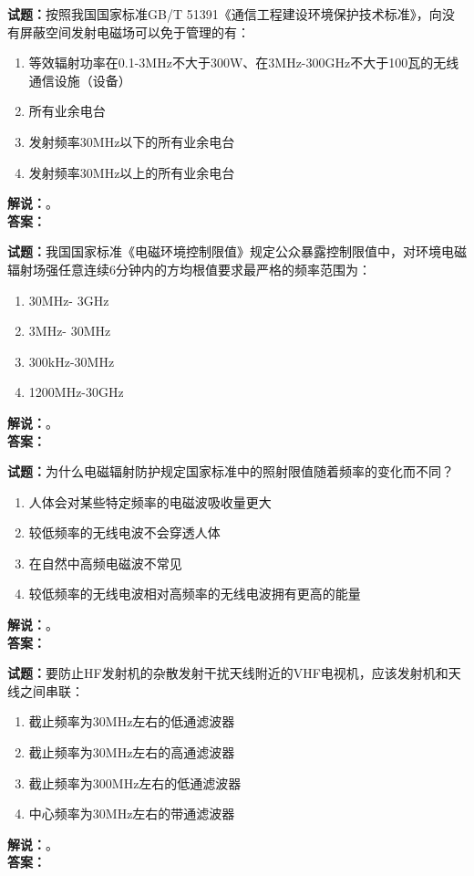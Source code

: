\documentclass{ctexbook}
\begin{document}
\noindent\textbf{试题：}按照我国国家标准GB/T 51391《通信工程建设环境保护技术标准》，向没有屏蔽空间发射电磁场可以免于管理的有：
\begin{enumerate}[leftmargin=3em]
\item 等效辐射功率在0.1-3\unit{\MHz}不大于300W、在3\unit{\MHz}-300\unit{\GHz}不大于100瓦的无线通信设施（设备）
\item 所有业余电台
\item 发射频率30\unit{\MHz}以下的所有业余电台
\item 发射频率30\unit{\MHz}以上的所有业余电台
\end{enumerate}
\noindent\textbf{解说：}\textbf{}。
\\\noindent\textbf{答案：}

\bigskip




\noindent\textbf{试题：}我国国家标准《电磁环境控制限值》规定公众暴露控制限值中，对环境电磁辐射场强任意连续6分钟内的方均根值要求最严格的频率范围为：
\begin{enumerate}[leftmargin=3em]
\item 30\unit{\MHz}- 3\unit{\GHz}
\item 3\unit{\MHz}- 30\unit{\MHz}
\item 300\unit{\kHz}-30\unit{\MHz}
\item 1200\unit{\MHz}-30\unit{\GHz}
\end{enumerate}
\noindent\textbf{解说：}\textbf{}。\\\noindent\textbf{答案：}

\bigskip




\noindent\textbf{试题：}为什么电磁辐射防护规定国家标准中的照射限值随着频率的变化而不同？
\begin{enumerate}[leftmargin=3em]
\item 人体会对某些特定频率的电磁波吸收量更大
\item 较低频率的无线电波不会穿透人体
\item 在自然中高频电磁波不常见
\item 较低频率的无线电波相对高频率的无线电波拥有更高的能量
\end{enumerate}
\noindent\textbf{解说：}\textbf{}。\\\noindent\textbf{答案：}

\bigskip




\noindent\textbf{试题：}要防止HF发射机的杂散发射干扰天线附近的VHF电视机，应该发射机和天线之间串联：
\begin{enumerate}[leftmargin=3em]
\item 截止频率为30\unit{\MHz}左右的低通滤波器
\item 截止频率为30\unit{\MHz}左右的高通滤波器
\item 截止频率为300\unit{\MHz}左右的低通滤波器
\item 中心频率为30\unit{\MHz}左右的带通滤波器
\end{enumerate}
\noindent\textbf{解说：}\textbf{}。\\\noindent\textbf{答案：}
\end{document}
